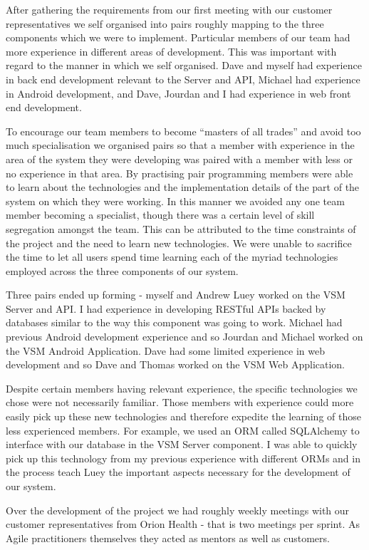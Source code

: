 \documentclass[conference]{IEEEtran}
\begin{document}
After gathering the requirements from our first meeting with our customer
representatives we self organised into pairs roughly mapping to the three
components which we were to implement. Particular members of our team had more
experience in different areas of development. This was important with regard to
the manner in which we self organised. Dave and myself had experience in back
end development relevant to the Server and API, Michael had experience in
Android development, and Dave, Jourdan and I had experience in web front end
development.

To encourage our team members to become ``masters of all trades'' and avoid too
much specialisation we organised pairs so that a member with experience in the
area of the system they were developing was paired with a member with less or no
experience in that area. By practising pair programming members were able to
learn about the technologies and the implementation details of the part of the
system on which they were working. In this manner we avoided any one team member
becoming a specialist, though there was a certain level of skill segregation
amongst the team. This can be attributed to the time constraints of the project
and the need to learn new technologies. We were unable to sacrifice the time to
let all users spend time learning each of the myriad technologies employed
across the three components of our system.

Three pairs ended up forming - myself and Andrew Luey worked on the VSM Server
and API. I had experience in developing RESTful APIs backed by databases similar
to the way this component was going to work. Michael had previous Android
development experience and so Jourdan and Michael worked on the VSM Android
Application. Dave had some limited experience in web development and so Dave and
Thomas worked on the VSM Web Application.

Despite certain members having relevant experience, the specific technologies we
chose were not necessarily familiar. Those members with experience could more
easily pick up these new technologies and therefore expedite the learning of
those less experienced members. For example, we used an ORM called SQLAlchemy to
interface with our database in the VSM Server component. I was able to quickly
pick up this technology from my previous experience with different ORMs and in
the process teach Luey the important aspects necessary for the development of
our system.

Over the development of the project we had roughly weekly meetings with our
customer representatives from Orion Health - that is two meetings per sprint. As
Agile practitioners themselves they acted as mentors as well as customers.
\end{document}

